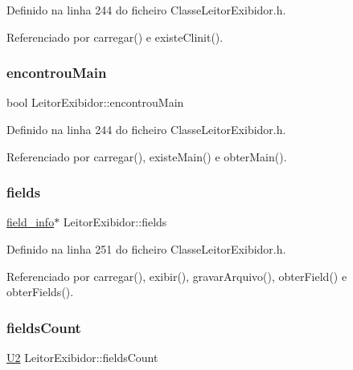 Definido na linha 244 do ficheiro Classe\+Leitor\+Exibidor.\+h.



Referenciado por carregar() e existe\+Clinit().

\mbox{\label{classLeitorExibidor_aca32f682d0ccd1d60a76d0833ca0617f}} 
\subsubsection{\texorpdfstring{encontrou\+Main}{encontrouMain}}
{\footnotesize\ttfamily bool Leitor\+Exibidor\+::encontrou\+Main\hspace{0.3cm}{\ttfamily [private]}}



Definido na linha 244 do ficheiro Classe\+Leitor\+Exibidor.\+h.



Referenciado por carregar(), existe\+Main() e obter\+Main().

\mbox{\label{classLeitorExibidor_a6e8475e2db54d776db636c06d823eb3f}} 
\subsubsection{\texorpdfstring{fields}{fields}}
{\footnotesize\ttfamily \hyperlink{structfield__info}{field\+\_\+info}$\ast$ Leitor\+Exibidor\+::fields\hspace{0.3cm}{\ttfamily [private]}}



Definido na linha 251 do ficheiro Classe\+Leitor\+Exibidor.\+h.



Referenciado por carregar(), exibir(), gravar\+Arquivo(), obter\+Field() e obter\+Fields().

\mbox{\label{classLeitorExibidor_a9a54627d53b9a3c25c5ba71977e1e002}} 
\subsubsection{\texorpdfstring{fields\+Count}{fieldsCount}}
{\footnotesize\ttfamily \hyperlink{BasicTypes_8h_a90240657108b1b457eef9d3f76e0202e}{U2} Leitor\+Exibidor\+::fields\+Count\hspace{0.3cm}{\ttfamily [private]}}



